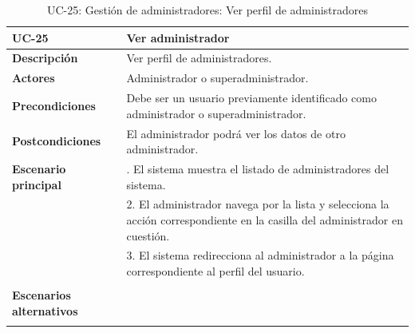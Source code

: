 \begin{table}
  \begin{center}
    \begin{tabularx}{16.4cm}{|l|X|}
      \hline
      \textbf{UC-25} & \textbf{Ver administrador}\\
      \hline
      \textbf{Descripción} & Ver perfil de administradores. \\
      \hline
      \textbf{Actores} & Administrador o superadministrador.\\
      \hline
      \textbf{Precondiciones} & Debe ser un usuario previamente identificado como administrador o superadministrador.\\
      \hline
      \textbf{Postcondiciones} & El administrador podrá ver los datos de otro administrador.\\
      \hline
      \textbf{Escenario principal} & \smallskip 1. El sistema muestra el listado de administradores del sistema.\\
      & 2. El administrador navega por la lista y selecciona la acción correspondiente en la casilla del administrador en cuestión.\\
      & 3. El sistema redirecciona al administrador a la página correspondiente al perfil del usuario.\\
      & \\
      \hline
      \textbf{Escenarios alternativos} & \\
      & \\
      \hline
    \end{tabularx}
    \caption{UC-25: Gestión de administradores: Ver perfil de administradores}
    \label{tab:CU-ver-perfil-de-admin}
  \end{center}
\end{table}



